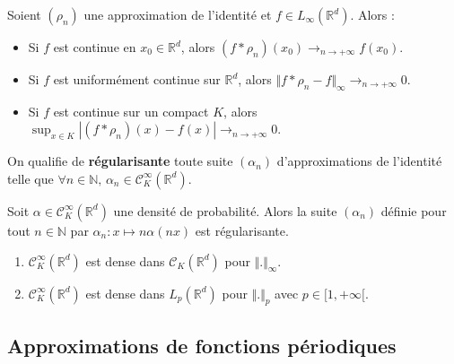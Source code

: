 	\begin{theorem}
		Soient $(\rho_n)$ une approximation de l'identité et $f \in L_\infty(\mathbb{R}^d)$. Alors :
		\begin{itemize}
			\item Si $f$ est continue en $x_0 \in \mathbb{R}^d$, alors $(f * \rho_n)(x_0) \longrightarrow_{n \rightarrow +\infty} f(x_0)$.
			\item Si $f$ est uniformément continue sur $\mathbb{R}^d$, alors $\Vert f * \rho_n - f \Vert_\infty \longrightarrow_{n \rightarrow +\infty} 0$.
			\item Si $f$ est continue sur un compact $K$, alors $\sup_{x \in K} |(f * \rho_n)(x) - f(x)| \longrightarrow_{n \rightarrow +\infty} 0$.
		\end{itemize}
	\end{theorem}

	\begin{definition}
		On qualifie de \textbf{régularisante} toute suite $(\alpha_n)$ d'approximations de l'identité telle que $\forall n \in \mathbb{N}, \, \alpha_n \in \mathcal{C}^\infty_K(\mathbb{R}^d)$.
	\end{definition}


	\begin{example}
		Soit $\alpha \in \mathcal{C}^\infty_K(\mathbb{R}^d)$ une densité de probabilité. Alors la suite $(\alpha_n)$ définie pour tout $n \in \mathbb{N}$ par $\alpha_n : x \mapsto n \alpha(nx)$ est régularisante.
	\end{example}


	\begin{application}
		\begin{enumerate}[label=(\roman*)]
			\item $\mathcal{C}^\infty_K(\mathbb{R}^d)$ est dense dans $\mathcal{C}_K(\mathbb{R}^d)$ pour $\Vert . \Vert_\infty$.
			\item $\mathcal{C}^\infty_K(\mathbb{R}^d)$ est dense dans $L_p(\mathbb{R}^d)$ pour $\Vert . \Vert_p$ avec $p \in [1, +\infty[$.
		\end{enumerate}
	\end{application}
	
	\newpage

	\subsection{Approximations de fonctions périodiques}

